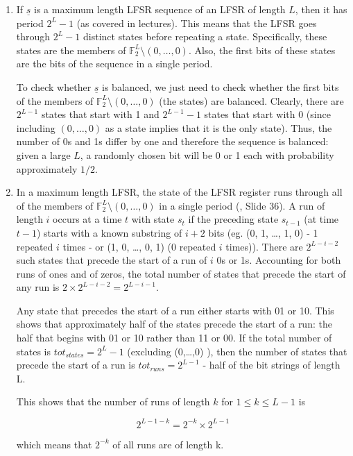 \begin{enumerate}

\item If $\underline{s}$ is a maximum length LFSR sequence of an LFSR of length
$L$, then it has period $2^L-1$ (as covered in lectures). This means that the
LFSR goes through $2^L-1$ distinct states before repeating a state.
Specifically, these states are the members of $\mathbb{F}_2^L \setminus
{(0,\dots,0)}$. Also, the first bits of these states are the bits of the
sequence in a single period.

To check whether $\underline{s}$ is balanced, we just need to check whether the
first bits of the members of $\mathbb{F}_2^L \setminus {(0,\dots,0)}$ (the
states) are balanced. Clearly, there are $2^{L-1}$ states that start with 1 and
$2^{L-1}-1$ states that start with 0 (since including $(0,\dots,0)$ as a state
implies that it is the only state). Thus, the number of 0s and 1s differ by one
and therefore the sequence is balanced: given a large $L$, a randomly chosen bit
will be 0 or 1 each with probability approximately $1/2$.

\item In a maximum length LFSR, the state of the LFSR register runs through all
of the members of $\mathbb{F}_2^L \setminus {(0,\dots,0)}$ in a single period
(\cite{slides}, Slide 36). A run of length $i$ occurs at a time $t$ with state
$s_t$ if the preceding state $s_{t-1}$ (at time $t-1$) starts with a known
substring of $i+2$ bits (eg. (0, 1, \dots, 1, 0) - 1 repeated $i$ times - or (1,
0, \dots, 0, 1) (0 repeated $i$ times)). There are $2^{L-i-2}$ such states that
precede the start of a run of $i$ 0s or 1s. Accounting for both runs of ones and
of zeros, the total number of states that precede the start of any run is $2
\times 2^{L-i-2} = 2^{L-i-1}$.

Any state that precedes the start of a run either starts with 01 or 10. This
shows that approximately half of the states precede the start of a run: the half
that begins with 01 or 10 rather than 11 or 00. If the total number of states is
$tot_{states} = 2^L-1$ (excluding (0,\dots,0) ), then the number of states that
precede the start of a run is $tot_{runs} = 2^{L-1}$ - half of the bit strings
of length L.

This shows that the number of runs of length $k$ for $1 \le k \le L-1$ is

\[2^{L-1-k} = 2^{-k} \times 2^{L-1}\]

which means that $2^{-k}$ of all runs are of length k.


\end{enumerate}
